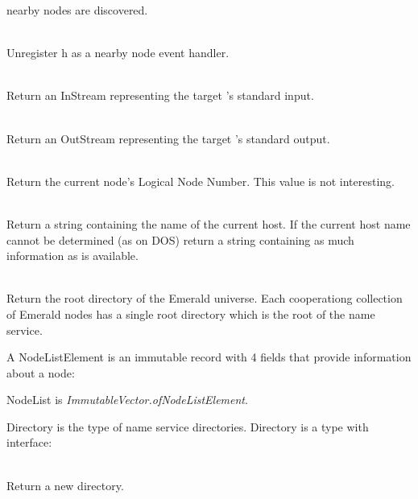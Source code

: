 \begin{desc}
    nearby nodes are discovered.
  \item[\kw{operation} removeNearbyNodeEventHandler\/\LB{}h \CO{} HandlerType\/\RB{}]~\\
    Unregister h as a nearby node event handler. 
  \item[\kw{operation} getStdin \returns{} \/\LB{}InStream\/\RB{}]~\\
    Return an InStream representing the target 's standard input.
  \item[\kw{operation} getStdout \returns{} \/\LB{}OutStream\/\RB{}]~\\
    Return an OutStream representing the target 's standard output.
  \item[\kw{function} getLNN \returns{} \/\LB{}\tn{Integer}\/\RB{}]~\\
    Return the current node's Logical Node Number.  This value is not
    interesting.
  \item[\kw{function} getName \returns{} \/\LB{}\tn{String}\/\RB{}]~\\
    Return a string containing the name of the current host.  If the current
    host name cannot be determined (as on DOS) return a string containing as
    much information as is available.
  \item[\kw{function} getRootDirectory \returns{} \/\LB{}\tn{Directory}\/\RB{}]~\\
    Return the root directory of the Emerald universe.  Each cooperationg
    collection of Emerald nodes has a single root directory which is the
    root of the name service.
\end{desc}

\noindent A NodeListElement is an immutable record with 4 fields that
provide information about a node:

\begin{desc}
  \item[\kw{function} getTheNode \returns{} \/\LB{}\tn{Node}\/\RB{}]
  \item[\kw{function} getUp \returns{} \/\LB{}\tn{Boolean}\/\RB{}]
  \item[\kw{function} getIncarnationTime \returns{} \/\LB{}Time\/\RB{}]
  \item[\kw{function} getLNN \returns{} \/\LB{}\tn{Integer}\/\RB{}]
\end{desc}

\noindent NodeList is
{\it ImmutableVector.of\/\LB{}NodeListElement\/\RB{}}.

Directory is the type of name service directories.  Directory is a type with
interface:
\begin{desc}
  \item[\kw{operation} create \returns{} \/\LB{}r \CO{} Directory\/\RB{}]~\\
    Return a new directory.
\end{desc}

